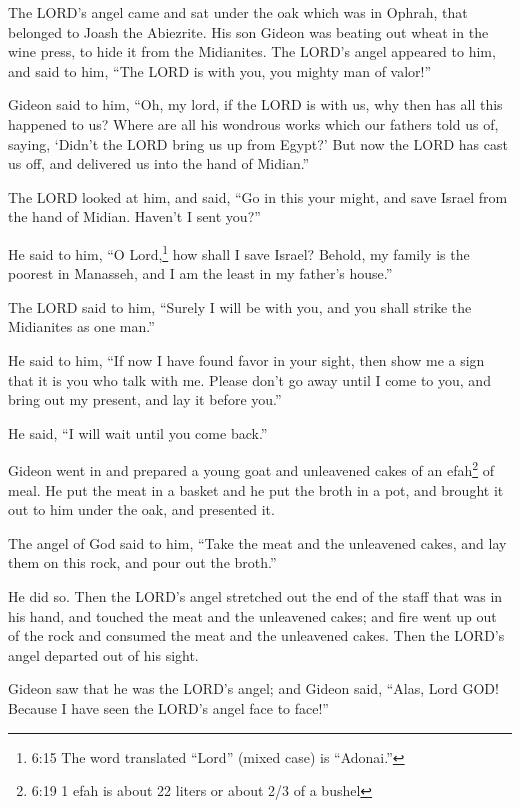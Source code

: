 \myverse{}The LORD’s angel came and sat under the oak which was in Ophrah,
that belonged to Joash the Abiezrite. His son Gideon was beating out wheat in the wine press, to hide
it from the Midianites.
\myverse{}The LORD’s angel appeared to him, and said to him, “The LORD is with you,
you mighty man of valor!”

\myverse{}Gideon said to him, “Oh, my lord, if the LORD is with us, why
then has all this happened to us? Where are all his wondrous works which our fathers told us of, saying,
‘Didn’t the LORD bring us up from Egypt?’ But now the LORD has cast us off, and delivered us into the
hand of Midian.”

\myverse{}The LORD looked at him, and said, “Go in this your might, and
save Israel from the hand of Midian. Haven’t I sent you?”

\myverse{}He said to him, “O Lord,\footnote{6:15 The word translated “Lord” (mixed case) is “Adonai.”} how shall I save Israel? Behold,
my family is the poorest in Manasseh, and I am the least in my father’s house.”

\myverse{}The LORD said to him, “Surely I will be with you, and you shall
strike the Midianites as one man.”

\myverse{}He said to him, “If now I have found favor in your sight, then
show me a sign that it is you who talk with me.
\myverse{}Please don’t go away until I come to you, and bring out my present, and lay
it before you.”

He said, “I will wait until you come back.”

\myverse{}Gideon went in and prepared a young goat and unleavened cakes
of an efah\footnote{6:19 1 efah is about 22 liters or about 2/3 of a bushel} of meal. He put the meat in a basket
and he put the broth in a pot, and brought it out to him under the oak, and presented it.

\myverse{}The angel of God said to him, “Take the meat and the unleavened
cakes, and lay them on this rock, and pour out the broth.”

He did so.
\myverse{}Then the LORD’s angel stretched out the end of the staff that was in his hand,
and touched the meat and the unleavened cakes; and fire went up out of the rock and consumed the meat
and the unleavened cakes. Then the LORD’s angel departed out of his sight.

\myverse{}Gideon saw that he was the LORD’s angel; and Gideon said, “Alas,
Lord GOD! Because I have seen the LORD’s angel face to face!”

